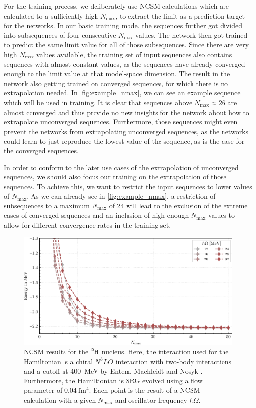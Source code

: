 For the training process, we deliberately use NCSM calculations which are calculated to a sufficiently high $N_\mathrm{max}$, to extract the limit as a prediction target for the networks. In our basic training mode, the sequences further got divided into subsequences of four consecutive $N_\mathrm{max}$ values. The network then got trained to predict the same limit value for all of those subsequences. Since there are very high $N_\mathrm{max}$ values available, the training set of input sequences also contains sequences with almost constant values, as the sequences have already converged enough to the limit value at that model-space dimension. The result in the network also getting trained on converged sequences, for which there is no extrapolation needed. In \autoref{fig:example_nmax}, we can see an example sequence which will be used in training. It is clear that sequences above $N_\mathrm{max} \approx 26$ are almost converged and thus provide no new insights for the network about how to extrapolate unconverged sequences. Furthermore, those sequences might even prevent the networks from extrapolating unconverged sequences, as the networks could learn to just reproduce the lowest value of the sequence, as is the case for the converged sequences.

In order to conform to the later use cases of the extrapolation of unconverged sequences, we should also focus our training on the extrapolation of those sequences. To achieve this, we want to restrict the input sequences to lower values of $N_\mathrm{max}$. As we can already see in \autoref{fig:example_nmax}, a restriction of subsequences to a maximum $N_\mathrm{max}$ of 24 will lead to the exclusion of the extreme cases of converged sequences and an inclusion of high enough $N_\mathrm{max}$ values to allow for different convergence rates in the training set.
\begin{figure}[H]
  \centering
  \includegraphics{media/example_sequence.pdf}
  \caption{NCSM results for the $\n{2}{H}$ nucleus. Here, the interaction used for the Hamiltonian is a chiral $N^{3}LO$ interaction with two-body interactions and a cutoff at \SI{400}{\mega\electronvolt} by Entem, Machleidt and Nosyk \cite{entemmachleidt}. Furthermore, the Hamiltionian is SRG evolved using a flow parameter of $\SI{0.04}{\femto\metre^4}$. Each point is the result of a NCSM calculation with a given $N_\mathrm{max}$ and oscillator frequency $\hbar \Omega$.}
  \label{fig:example_nmax}
\end{figure}
